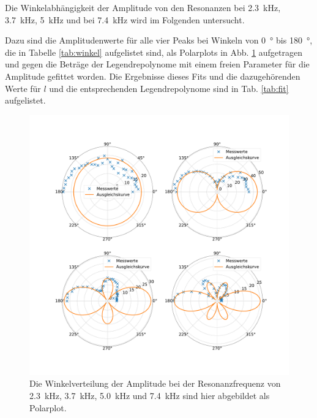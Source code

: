 Die Winkelabhängigkeit der Amplitude von den Resonanzen bei \SI{2.3}{\kilo\hertz}, \SI{3.7}{\kilo\hertz}, \SI{5}{\kilo\hertz} und bei \SI{7.4}{\kilo\hertz} wird im Folgenden untersucht. 

Dazu sind die Amplitudenwerte für alle vier Peaks bei Winkeln von \SI{0}{\degree} bis \SI{180}{\degree}, die in Tabelle \ref{tab:winkel} aufgelistet sind, als Polarplots in Abb. \ref{fig:polar23} aufgetragen und gegen die Beträge der Legendrepolynome mit einem freien Parameter für die Amplitude gefittet worden.
Die Ergebnisse dieses Fits und die dazugehörenden Werte für $l$ und die entsprechenden Legendrepolynome sind in Tab. \ref{tab:fit} aufgelistet.

\begin{figure}
    \centering
    \includegraphics[width=\textwidth]{plots/C_polar1.pdf}
    \caption{Die Winkelverteilung der Amplitude bei der Resonanzfrequenz von \SI{2.3}{\kilo\hertz}, \SI{3.7}{\kilo\hertz}, \SI{5.0}{\kilo\hertz} und \SI{7.4}{\kilo\hertz} sind hier abgebildet als Polarplot.}
    \label{fig:polar23}
\end{figure}


